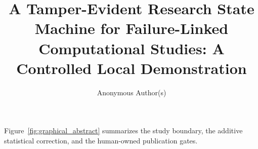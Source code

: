 \documentclass[sigconf,anonymous,nonacm]{acmart}
\title{A Tamper-Evident Research State Machine for Failure-Linked
Computational Studies: A Controlled Local Demonstration}
\author{Anonymous Author(s)}
\affiliation{%
  \institution{Anonymous submission}
  \country{}
}
\date{}
\begin{document}


\maketitle

\noindent Figure~\ref{fig:graphical_abstract} summarizes the study boundary,
the additive statistical correction, and the human-owned publication gates.














\appendix

\end{document}
